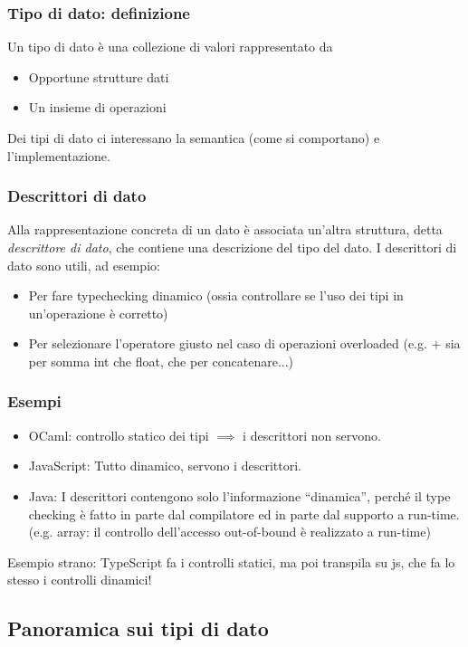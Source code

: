 \documentclass[a4paper,10pt]{article}
\begin{document}
\subsubsection{Tipo di dato: definizione}
Un tipo di dato è una collezione di valori rappresentato da 
\begin{itemize}
 \item Opportune strutture dati
 \item Un insieme di operazioni
\end{itemize}

Dei tipi di dato ci interessano la semantica (come si comportano) e l'implementazione.
\subsubsection{Descrittori di dato}
Alla rappresentazione concreta di un dato è associata un'altra struttura, detta \emph{descrittore di dato}, che contiene una descrizione del tipo del dato. I descrittori di dato sono utili, ad esempio:
\begin{itemize}
 \item Per fare typechecking dinamico (ossia controllare se l'uso dei tipi in un'operazione è corretto)
 \item Per selezionare l'operatore giusto nel caso di operazioni overloaded (e.g. $+$ sia per somma int che float, che per concatenare...)
\end{itemize}
\subsubsection{Esempi}
\begin{itemize}
 \item OCaml: controllo statico dei tipi $\implies$ i descrittori non servono.
 \item JavaScript: Tutto dinamico, servono i descrittori.
 \item Java: I descrittori contengono solo l'informazione ``dinamica'', perché il type checking è fatto in parte dal compilatore ed in parte dal supporto a run-time. (e.g. array: il controllo dell'accesso out-of-bound è realizzato a run-time)
\end{itemize}
Esempio strano: TypeScript fa i controlli statici, ma poi transpila su js, che fa lo stesso i controlli dinamici!\newpage

\subsection{Panoramica sui tipi di dato}
\end{document}
